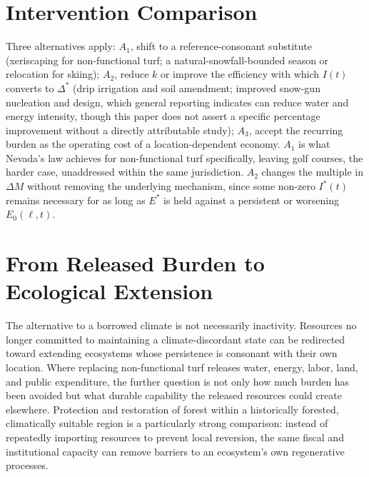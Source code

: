 \documentclass[11pt]{article}
\begin{document}
\section{Intervention Comparison}

Three alternatives apply: $A_1$, shift to a reference-consonant substitute (xeriscaping for non-functional turf; a natural-snowfall-bounded season or relocation for skiing); $A_2$, reduce $k$ or improve the efficiency with which $I(t)$ converts to $\Delta^{*}$ (drip irrigation and soil amendment; improved snow-gun nucleation and design, which general reporting indicates can reduce water and energy intensity, though this paper does not assert a specific percentage improvement without a directly attributable study); $A_3$, accept the recurring burden as the operating cost of a location-dependent economy. $A_1$ is what Nevada's law achieves for non-functional turf specifically, leaving golf courses, the harder case, unaddressed within the same jurisdiction. $A_2$ changes the multiple in $\Delta M$ without removing the underlying mechanism, since some non-zero $I^{*}(t)$ remains necessary for as long as $E^{*}$ is held against a persistent or worsening $E_0(\ell,t)$.

\section{From Released Burden to Ecological Extension}

The alternative to a borrowed climate is not necessarily inactivity. Resources no longer committed to maintaining a climate-discordant state can be redirected toward extending ecosystems whose persistence is consonant with their own location. Where replacing non-functional turf releases water, energy, labor, land, and public expenditure, the further question is not only how much burden has been avoided but what durable capability the released resources could create elsewhere. Protection and restoration of forest within a historically forested, climatically suitable region is a particularly strong comparison: instead of repeatedly importing resources to prevent local reversion, the same fiscal and institutional capacity can remove barriers to an ecosystem's own regenerative processes.
\end{document}
